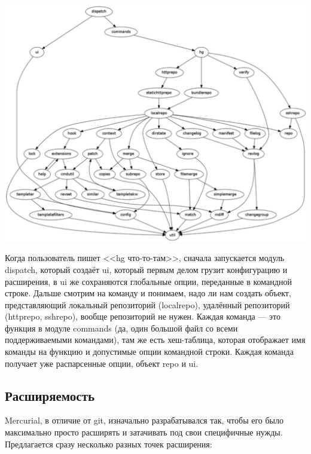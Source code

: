 \documentclass[a5paper]{article}
\begin{document}
\begin{center}
    \includegraphics[width=\textwidth]{mercurialImportGraph.png}
\end{center}

Когда пользователь пишет <<hg что-то-там>>, сначала запускается модуль dispatch, который создаёт ui, который первым делом грузит конфигурацию и расширения, в ui же сохраняются глобальные опции, переданные в командной строке. Дальше смотрим на команду и понимаем, надо ли нам создать объект, представляющий локальный репозиторий (localrepo), удалённый репозиторий (httprepo, sshrepo), вообще репозиторий не нужен. Каждая команда --- это функция в модуле commands (да, один большой файл со всеми поддерживаемыми командами), там же есть хеш-таблица, которая отображает имя команды на функцию и допустимые опции командной строки. Каждая команда получает уже распарсенные опции, объект repo и ui.

\subsection{Расширяемость}

Mercurial, в отличие от git, изначально разрабатывался так, чтобы его было максимально просто расширять и затачивать под свои специфичные нужды. Предлагается сразу несколько разных точек расширения:
\end{document}
